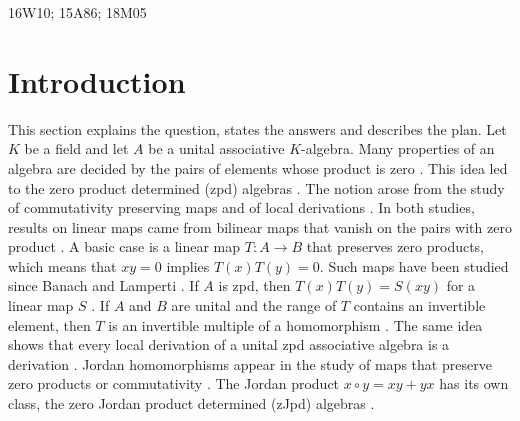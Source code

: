 \documentclass[]{interact}
\theoremstyle{plain}
\theoremstyle{definition}
\theoremstyle{remark}
\begin{document}
\begin{amscode}
16W10; 15A86; 18M05
\end{amscode}

\section{Introduction}

This section explains the question, states the answers and describes the plan.
Let $K$ be a field and let $A$ be a unital associative $K$-algebra.
Many properties of an algebra are decided by the pairs of elements whose product is zero \citep[Preface]{Bresar2021}.
This idea led to the zero product determined (zpd) algebras \citep[Definition 1.1]{Bresar2021}.
The notion arose from the study of commutativity preserving maps and of local derivations \citep[Preface]{Bresar2021}.
In both studies, results on linear maps came from bilinear maps that vanish on the pairs with zero product \citep[Preface]{Bresar2021}.
A basic case is a linear map $T \colon A \to B$ that preserves zero products, which means that $xy = 0$ implies $T(x)T(y) = 0$.
Such maps have been studied since Banach and Lamperti \citep[\S7.1]{Bresar2021}.
If $A$ is zpd, then $T(x)T(y) = S(xy)$ for a linear map $S$ \citep[Theorem 7.2]{Bresar2021}.
If $A$ and $B$ are unital and the range of $T$ contains an invertible element, then $T$ is an invertible multiple of a homomorphism \citep[Theorem 7.2]{Bresar2021}.
The same idea shows that every local derivation of a unital zpd associative algebra is a derivation \citep[Example 1.10]{Bresar2021}.
Jordan homomorphisms appear in the study of maps that preserve zero products or commutativity \citep[\S7.3]{Bresar2021}.
The Jordan product $x \circ y = xy + yx$ has its own class, the zero Jordan product determined (zJpd) algebras \citep[Definition 3.14]{Bresar2021}.
\end{document}
